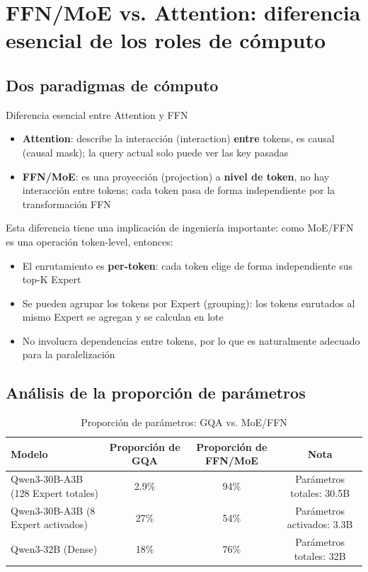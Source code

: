 \section{FFN/MoE vs. Attention: diferencia esencial de los roles de cómputo}

\subsection{Dos paradigmas de cómputo}

\begin{importantbox}{Diferencia esencial entre Attention y FFN}
\begin{itemize}
  \item \textbf{Attention}: describe la interacción (interaction) \textbf{entre} tokens, es causal (causal mask); la query actual solo puede ver las key pasadas
  \item \textbf{FFN/MoE}: es una proyección (projection) a \textbf{nivel de token}, no hay interacción entre tokens; cada token pasa de forma independiente por la transformación FFN
\end{itemize}
\end{importantbox}

Esta diferencia tiene una implicación de ingeniería importante: como MoE/FFN es una operación token-level, entonces:
\begin{itemize}
  \item El enrutamiento es \textbf{per-token}: cada token elige de forma independiente sus top-K Expert
  \item Se pueden agrupar los tokens por Expert (grouping): los tokens enrutados al mismo Expert se agregan y se calculan en lote
  \item No involucra dependencias entre tokens, por lo que es naturalmente adecuado para la paralelización
\end{itemize}

\subsection{Análisis de la proporción de parámetros}

\begin{table}[H]
\centering
\caption{Proporción de parámetros: GQA vs. MoE/FFN}
\begin{tabular}{lccc}
\toprule
\textbf{Modelo} & \textbf{Proporción de GQA} & \textbf{Proporción de FFN/MoE} & \textbf{Nota} \\
\midrule
Qwen3-30B-A3B (128 Expert totales) & 2.9\% & 94\% & Parámetros totales: 30.5B \\
Qwen3-30B-A3B (8 Expert activados) & 27\% & 54\% & Parámetros activados: 3.3B \\
Qwen3-32B (Dense) & 18\% & 76\% & Parámetros totales: 32B \\
\bottomrule
\end{tabular}
\end{table}

